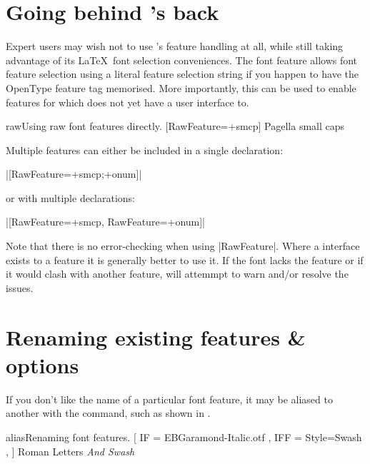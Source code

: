 \documentclass[a4paper]{l3doc}
\begin{document}
\section{Going behind 's back}

Expert users may wish not to use 's feature handling at all,
while still taking advantage of its \LaTeX\ font selection conveniences. The
 font feature allows font feature selection using a literal feature
selection string if you happen to have the OpenType feature tag memorised.
More importantly, this can be used to enable features for which 
does not yet have a user interface to.

\begin{Xexample}{raw}{Using raw font features directly.}
  [RawFeature=+smcp]
  Pagella small caps
\end{Xexample}

Multiple features can either be included in a single declaration:\par
{\centering|[RawFeature=+smcp;+onum]|\par}
\noindent or with multiple declarations:\par
{\centering|[RawFeature=+smcp, RawFeature=+onum]|\par}

Note that there is no error-checking when using |RawFeature|. Where a 
interface exists to a feature it is generally better to use it. If the font lacks the feature
or if it would clash with another feature,  will attemmpt to warn and/or resolve the issues.


\section{Renaming existing features \& options}
\label{sec:aliasfontfeature}

\DescribeMacro{\aliasfontfeature}
If you don't like the name of a particular font feature,
it may be aliased to another with the
 command,
such as shown in .

\begin{Xexample}{alias}{Renaming font features.}
  \setmainfont{ EBGaramond-Regular.otf }[
    IF  = EBGaramond-Italic.otf ,
    IFF = {Style=Swash} ,
  ]
   Roman Letters \itshape And Swash
\end{Xexample}
\end{document}
